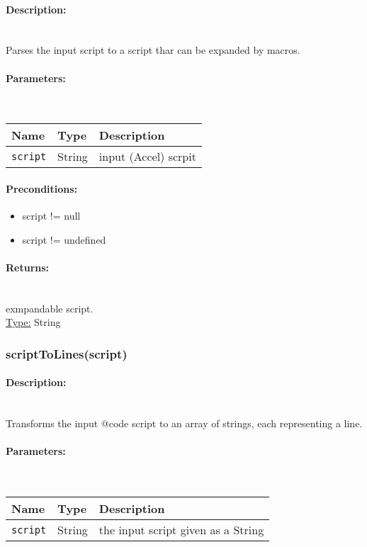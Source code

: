 \paragraph{Description:} \hfill \\ 
Parses the input script to a script thar can be expanded by macros.
\paragraph{Parameters:} \hfill \\ 
\begin{tabular}{|l|l|l|}
\hline
\textbf{Name} & \textbf{Type} & \textbf{Description} \\ 
\hline
\texttt{script} & String & input (Accel) scrpit\\ 
\hline
\end{tabular}
\paragraph{Preconditions:} 
\begin{itemize}  
\item  script != null
\item  script != undefined
\end{itemize}  
\paragraph{Returns:} \hfill \\ 
exmpandable script.\\ 
\underline{Type:} String
\subsubsection{scriptToLines(script)} 
\paragraph{Description:} \hfill \\ 
Transforms the input {@code script} to an array of strings,
each representing a line.
\paragraph{Parameters:} \hfill \\ 
\begin{tabular}{|l|l|l|}
\hline
\textbf{Name} & \textbf{Type} & \textbf{Description} \\ 
\hline
\texttt{script} & String & the input script given as a String\\ 
\hline
\end{tabular}
